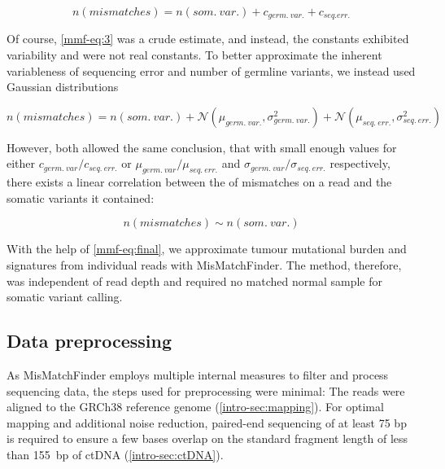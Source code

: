 \begin{equation}
n(mismatches) = n(som.~var.) + c_{germ.~var.} + c_{seq. err.}
\label{mmf-eq:3}
\end{equation}\myequation[\ref{mmf-eq:3}]{MisMatchFinder: germline variants}

Of course, \autoref{mmf-eq:3} was a crude estimate, and instead, the constants exhibited variability and were not real constants. To better approximate the inherent variableness of sequencing error and number of  germline variants, we instead used Gaussian distributions 

\begin{equation}
n(mismatches) = n(som.~var.) + \mathcal{N}(\mu_{germ.~var.}, \sigma_{germ.~var.}^{2}) + \mathcal{N}(\mu_{seq.~err.}, \sigma_{seq.~err.}^{2})
\label{mmf-eq:4}
\end{equation}
\myequation[\ref{mmf-eq:4}]{MisMatchFinder: number of mismatches with distributions}

However, both  allowed the same conclusion, that with small enough values for either $c_{germ.~var}/c_{seq.~err.}$ or $\mu_{germ.~var}/\mu_{seq.~err.}$ and $\sigma_{germ.~var}/\sigma_{seq.~err.}$ respectively, there exists a linear correlation between the  of mismatches on a read and the somatic variants it contained:

\begin{equation}
n(mismatches) \sim n(som.~var.)
\label{mmf-eq:final}
\end{equation}
\myequation[\ref{mmf-eq:final}]{MisMatchFinder: number of mismatches correlation with somatic variants}


With the help of \autoref{mmf-eq:final}, we  approximate tumour mutational burden and signatures from individual reads with MisMatchFinder. The method, therefore, was independent of read depth and required no matched normal sample for somatic variant calling.

\subsection{Data preprocessing}
As MisMatchFinder employs multiple internal measures to filter and process sequencing data, the steps used for preprocessing were minimal: The reads were  aligned to the GRCh38 reference genome (\autoref{intro-sec:mapping}). For optimal mapping and additional noise reduction, paired-end sequencing of at least 75 bp is required to ensure a few bases overlap on the standard fragment length of less than 155~bp of ctDNA (\autoref{intro-sec:ctDNA}). 

